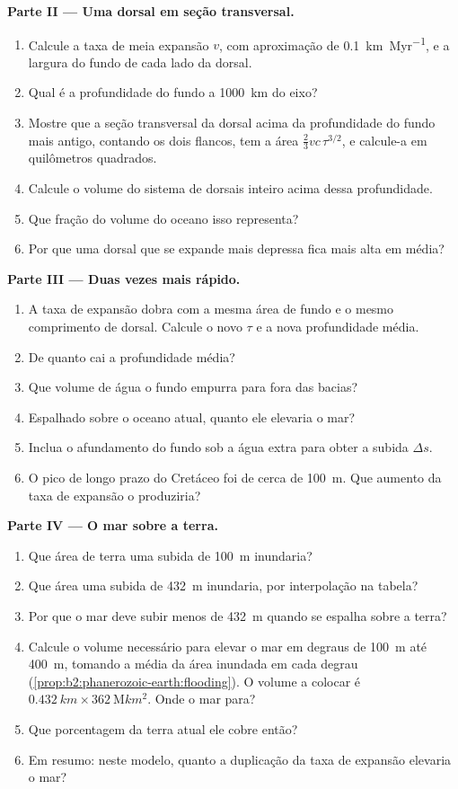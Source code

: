 \begin{problem}
\noindent\textbf{Parte II --- Uma dorsal em seção transversal.}
\begin{enumerate}[resume]
  \item Calcule a taxa de meia expansão $v$, com aproximação de \qty{0.1}{km.Myr^{-1}}, e a largura
        do fundo de cada lado da dorsal.
  \item Qual é a profundidade do fundo a \qty{1000}{km} do eixo?
  \item Mostre que a seção transversal da dorsal acima da profundidade do fundo mais antigo, contando
        os dois flancos, tem a área $\tfrac23 v c\,\tau^{3/2}$, e calcule-a em
        quilômetros quadrados.
  \item Calcule o volume do sistema de dorsais inteiro acima dessa profundidade.
  \item Que fração do volume do oceano isso representa?
  \item Por que uma dorsal que se expande mais depressa fica mais alta em média?
\end{enumerate}

\noindent\textbf{Parte III --- Duas vezes mais rápido.}
\begin{enumerate}[resume]
  \item A taxa de expansão dobra com a mesma área de fundo e o mesmo comprimento de dorsal. Calcule o novo $\tau$
        e a nova profundidade média.
  \item De quanto cai a profundidade média?
  \item Que volume de água o fundo empurra para fora das bacias?
  \item Espalhado sobre o oceano atual, quanto ele elevaria o mar?
  \item Inclua o afundamento do fundo sob a água extra para obter a subida $\Delta s$.
  \item O pico de longo prazo do Cretáceo foi de cerca de \qty{100}{m}. Que aumento da taxa de expansão
        o produziria?
\end{enumerate}

\noindent\textbf{Parte IV --- O mar sobre a terra.}
\begin{enumerate}[resume]
  \item Que área de terra uma subida de \qty{100}{m} inundaria?
  \item Que área uma subida de \qty{432}{m} inundaria, por interpolação na tabela?
  \item Por que o mar deve subir menos de \qty{432}{m} quando se espalha sobre a terra?
  \item Calcule o volume necessário para elevar o mar em degraus de \qty{100}{m} até \qty{400}{m},
        tomando a média da área inundada em cada degrau (\cref{prop:b2:phanerozoic-earth:flooding}).
        O volume a colocar é $\qty{0.432}{km} \times \qty{362}{\mega km^2}$. Onde o
        mar para?
  \item Que porcentagem da terra atual ele cobre então?
  \item Em resumo: neste modelo, quanto a duplicação da taxa de expansão elevaria o mar?
\end{enumerate}
\end{problem}
